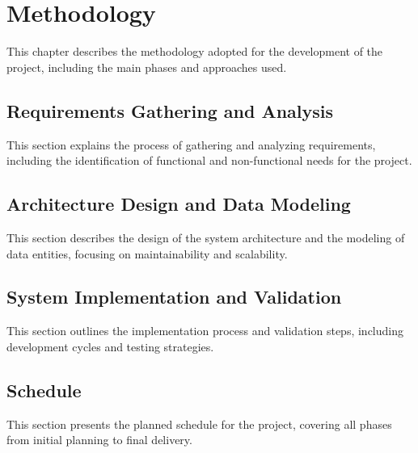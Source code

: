 
\chapter{Methodology}\label{cap:methodology}
This chapter describes the methodology adopted for the development of the project, including the main phases and approaches used.

\section{Requirements Gathering and Analysis}\label{section:req}
This section explains the process of gathering and analyzing requirements, including the identification of functional and non-functional needs for the project.

\section{Architecture Design and Data Modeling}
This section describes the design of the system architecture and the modeling of data entities, focusing on maintainability and scalability.

\section{System Implementation and Validation}
This section outlines the implementation process and validation steps, including development cycles and testing strategies.

\section{Schedule}
This section presents the planned schedule for the project, covering all phases from initial planning to final delivery.

